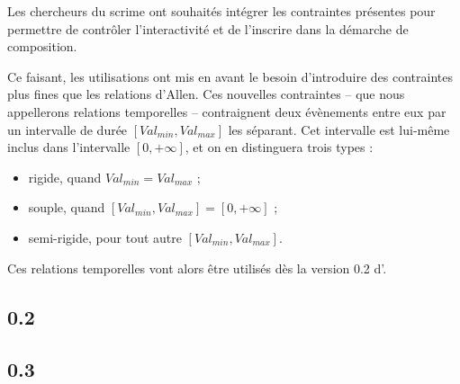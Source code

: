 Les chercheurs du \acrshort{scrime}\cite{Scrime2015} ont souhaités intégrer les contraintes présentes \boxes{}\cite{allombert:hal-00353628} pour permettre de contrôler l'interactivité et de l'inscrire dans la démarche de composition.

Ce faisant, les utilisations ont mis en avant le besoin d'introduire des contraintes plus fines que les relations d'Allen. Ces nouvelles contraintes -- que nous appellerons relations temporelles -- contraignent deux évènements entre eux par un intervalle de durée $[Val_{min}, Val_{max}]$ les séparant. Cet intervalle est lui-même inclus dans l'intervalle $[0,+\infty]$, et on en distinguera trois types :

\begin{itemize}

\item rigide, quand $Val_{min} = Val_{max}$ ;

\item souple, quand $[Val_{min}, Val_{max}] = [0,+\infty]$ ;

\item semi-rigide, pour tout autre $[Val_{min}, Val_{max}]$.

\end{itemize}

Ces relations temporelles vont alors être utilisés dès la version 0.2 d'\iscore{}.

\subsection{\iscore{} 0.2}

\subsection{\iscore{} 0.3}%
